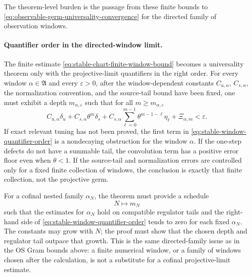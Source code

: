 The theorem-level burden is the passage from these finite bounds to
\eqref{eq:observable-germ-universality-convergence} for the directed family
of observation windows.

\paragraph{Quantifier order in the directed-window limit.}
The finite estimate
\eqref{eq:stable-chart-finite-window-bound} becomes a universality theorem
only with the projective-limit quantifiers in the right order.  For every
window \(\alpha\in\mathfrak A\) and every \(\varepsilon>0\), after the
window-dependent constants \(C_{u,\alpha}\), \(C_{s,\alpha}\), the
normalization convention, and the source-tail bound have been fixed, one
must exhibit a depth \(m_{\alpha,\varepsilon}\) such that for all
\(m\ge m_{\alpha,\varepsilon}\)
\begin{equation}
  C_{u,\alpha}\delta_u
  +
  C_{s,\alpha}\theta^m\delta_s
  +
  C_{s,\alpha}\sum_{\ell=0}^{m-1}
    \theta^{m-1-\ell}\eta_\ell
  +
  \Xi_{\alpha,m}
  <\varepsilon .
  \label{eq:stable-window-quantifier-order}
\end{equation}
If exact relevant tuning has not been proved, the first term in
\eqref{eq:stable-window-quantifier-order} is a nondecaying obstruction for
the window \(\alpha\).  If the one-step defects do not have a summable tail,
the convolution term has a positive error floor even when
\(\theta<1\).  If the source-tail and normalization errors are controlled
only for a fixed finite collection of windows, the conclusion is exactly
that finite collection, not the projective germ.

For a cofinal nested family \(\alpha_N\), the theorem must provide a schedule
\[
  N\longmapsto m_N
\]
such that the estimates for \(\alpha_N\) hold on compatible regulator tails
and the right-hand side of
\eqref{eq:stable-window-quantifier-order} tends to zero for each fixed
\(\alpha_N\).  The constants may grow with \(N\); the proof must show that
the chosen depth and regulator tail outpace that growth.  This is the same
directed-family issue as in the OS Gram bounds above: a finite numerical
window, or a family of windows chosen after the calculation, is not a
substitute for a cofinal projective-limit estimate.


